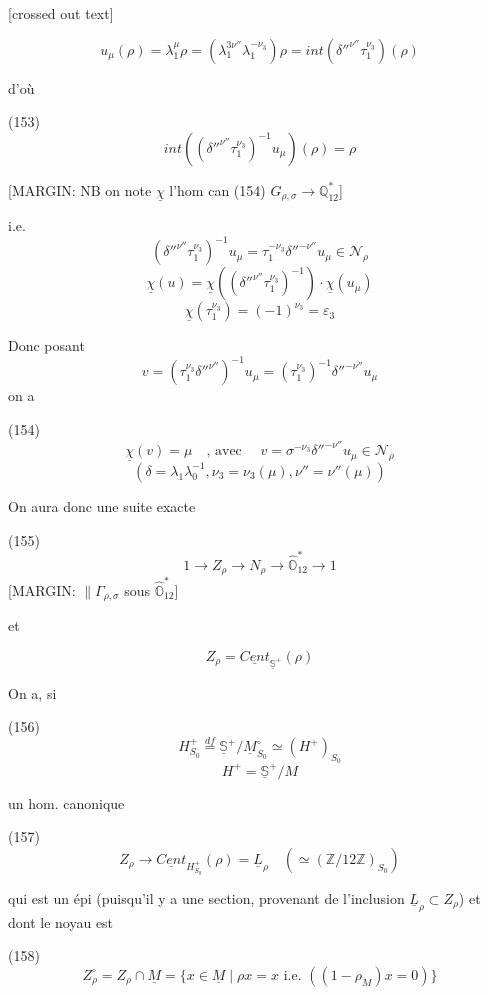 [crossed out text]

$$u_\mu(\rho) = \lambda_1^{\mu} \rho = (\lambda_1^{3\nu''} \lambda_1^{-\nu_3}) \rho = int({\delta''}^{\nu''} \tau_1^{\nu_3})(\rho)$$

d'où

(153) $$int(({\delta''}^{\nu''} \tau_1^{\nu_3})^{-1} u_\mu)(\rho) = \rho$$

[MARGIN: NB on note $\underline{\chi}$ l'hom can (154) $G_{\rho, \sigma} \to \mathbb{Q}_{12}^*$]

i.e.
$$({\delta''}^{\nu''} \tau_1^{\nu_3})^{-1} u_\mu = \tau_1^{-\nu_3} {\delta''}^{-\nu''} u_\mu \in \mathcal{N}_\rho$$
$$\underline{\chi}(u) = \underline{\chi}(({\delta''}^{\nu''} \tau_1^{\nu_3})^{-1}) \cdot \underline{\chi}(u_\mu)$$
$$\underline{\chi}(\tau_1^{\nu_3}) = (-1)^{\nu_3} = \varepsilon_3$$

Donc posant
$$v = (\tau_1^{\nu_3} {\delta''}^{\nu''})^{-1} u_\mu = (\tau_1^{\nu_3})^{-1} {\delta''}^{-\nu''} u_\mu$$
on a

(154) $$\underline{\chi}(v) = \mu \quad \text{, avec } \quad v = \sigma^{-\nu_3} {\delta''}^{-\nu''} u_\mu \in \mathcal{N}_\rho$$
$$(\delta = \lambda_1 \lambda_0^{-1}, \nu_3 = \nu_3(\mu), \nu'' = \nu''(\mu))$$

\newpage


On aura donc une suite exacte

(155) 
$$1 \longrightarrow Z_\rho \longrightarrow N_\rho \longrightarrow \widehat{\mathbb{O}}_{12}^* \longrightarrow 1$$
[MARGIN: $\| \Gamma_{\rho,\sigma}$ sous $\widehat{\mathbb{O}}_{12}^*$]

et

$$Z_\rho = \underline{Cent}_{\underline{\mathbb{S}}^+} (\rho)$$

On a, si

(156)
$$H_{S_0}^+ \overset{df}{=} \underline{\mathbb{S}}^+ / \underline{M}_{S_0}^\circ \simeq (H^+)_{S_0}$$
$$H^+ = \underline{\mathbb{S}}^+ / M$$

un hom. canonique

(157) $$Z_\rho \longrightarrow \underline{Cent}_{H_{S_0}^+} (\rho) = \underline{L}_\rho \quad (\simeq (\mathbb{Z}/12\mathbb{Z})_{S_0})$$

qui est un épi (puisqu'il y a une section, provenant de l'inclusion $\underline{L}_\rho \subset Z_\rho$) et dont le noyau est

(158) $$Z_\rho^\circ = Z_\rho \cap \underline{M} = \{ x \in \underline{M} \mid \rho x = x \text{ i.e. } ((1-\rho_M)x = 0) \}$$

